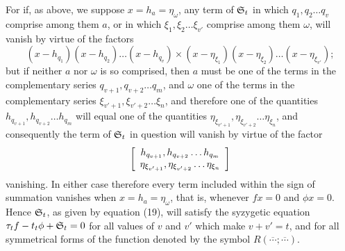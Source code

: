 \documentclass[11pt]{article}
\newcommand{\sourcepage}[1]{\marginpar{\scriptsize p.~#1}}
\begin{document}
\sourcepage{461}
For if, as above, we suppose $x=h_a=\eta_\omega$, any term of $\mathfrak{S}_t$ in which $q_1,q_2\ldots q_v$ comprise among them $a$, or in which $\xi_1,\xi_2\ldots\xi_{v'}$ comprise among them $\omega$, will vanish by virtue of the factors
\[
(x-h_{q_1})(x-h_{q_2})\ldots(x-h_{q_v})\times
(x-\eta_{\xi_1})(x-\eta_{\xi_2})\ldots(x-\eta_{\xi_{v'}});
\]
but if neither $a$ nor $\omega$ is so comprised, then $a$ must be one of the terms in the complementary series $q_{v+1},q_{v+2}\ldots q_m$, and $\omega$ one of the terms in the complementary series $\xi_{v'+1},\xi_{v'+2}\ldots\xi_n$, and therefore one of the quantities $h_{q_{v+1}},h_{q_{v+2}}\ldots h_{q_m}$ will equal one of the quantities $\eta_{\xi_{v'+1}},\eta_{\xi_{v'+2}}\ldots\eta_{\xi_n}$, and consequently the term of $\mathfrak{S}_t$ in question will vanish by virtue of the factor
\[
\left[\begin{array}{c}h_{q_{v+1}},h_{q_{v+2}}\ldots h_{q_m}\\\eta_{\xi_{v'+1}},\eta_{\xi_{v'+2}}\ldots\eta_{\xi_n}\end{array}\right]
\]
vanishing. In either case therefore every term included within the sign of summation vanishes when $x=h_a=\eta_\omega$, that is, whenever $fx=0$ and $\phi x=0$. Hence $\mathfrak{S}_t$, as given by equation (19), will satisfy the syzygetic equation $\tau_tf-t_t\phi+\mathfrak{S}_t=0$ for all values of $v$ and $v'$ which make $v+v'=t$, and for all symmetrical forms of the function denoted by the symbol $R(\overline{\cdots};\overline{\cdots})$.
\end{document}
